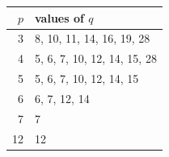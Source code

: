 \begin{center}\begin{tabular}{rl}\toprule
$p$&values of $q$\\\midrule
3&8, 10, 11, 14, 16, 19, 28\\
4&5, 6, 7, 10, 12, 14, 15, 28\\
5&5, 6, 7, 10, 12, 14, 15\\
6&6, 7, 12, 14\\
7&7\\
12&12\\
\bottomrule\end{tabular}\end{center}
